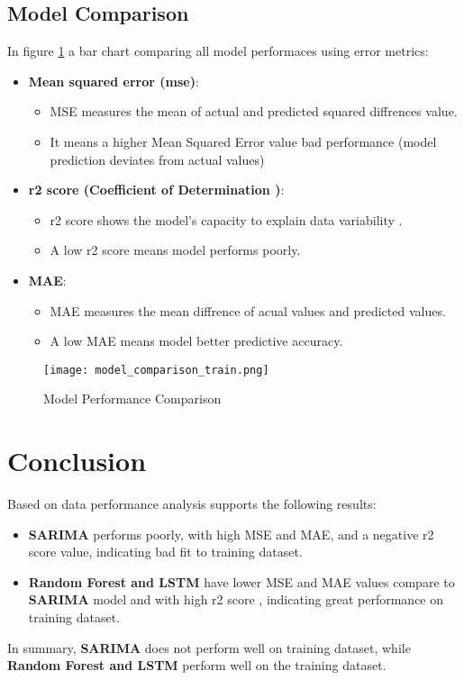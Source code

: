 \documentclass{article}
\begin{document}
\subsection{Model Comparison}
In figure \ref{fig:comparison} a bar chart comparing all model performaces using error metrics:
\begin{itemize}
    \item \textbf{Mean squared error (mse)}:
        \begin{itemize}
        \item MSE measures the mean of actual and predicted squared diffrences value.
        \item It means a higher Mean Squared Error value  bad performance (model prediction deviates from actual values)
        \end{itemize}
    \item \textbf{r2 score (Coefficient of Determination )}:
    \begin{itemize}
    
        \item r2 score shows the model's capacity to explain data variability .
        \item A low r2 score means model performs poorly. 
    \end{itemize}
    \item \textbf{MAE}:
        \begin{itemize}

        \item MAE measures the mean diffrence of acual values and predicted values.
        \item A low MAE means model better predictive accuracy. 
        \end{itemize}
\end{itemize}

\begin{figure}[H]
    \centering
    \texttt{[image: model\_comparison\_train.png]}
    \caption{Model Performance Comparison}
    \label{fig:comparison}
\end{figure}

\section{Conclusion}
Based on  data performance analysis supports the following results:\begin{itemize}
    \item \textbf{SARIMA} performs poorly, with high MSE and MAE, and a negative r2 score value, indicating bad fit to training dataset.
    \item \textbf{Random Forest and LSTM} have lower MSE and MAE values compare to \textbf{SARIMA} model and with high r2 score , indicating great performance on training dataset.
\end{itemize}

In summary, \textbf{SARIMA} does not perform well on  training dataset, while \textbf{ Random Forest and LSTM} perform well on the training dataset.
\end{document}
